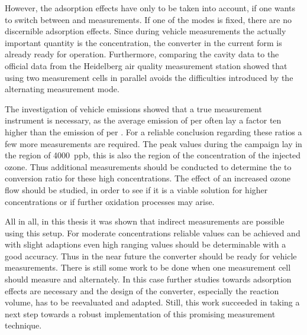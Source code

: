 However, the adsorption effects have only to be taken into account, if
one wants to switch between  and  measurements. If
one of the modes is fixed, there are no discernible
adsorption effects. Since during vehicle measurements the actually
important quantity is the  concentration, the converter in
the current form is already ready for operation. Furthermore,
comparing the cavity data to the official data from the Heidelberg air
quality measurement station showed that using two measurement cells in
parallel avoids the difficulties introduced by the alternating
measurement mode.

The investigation of vehicle emissions showed that a true 
measurement instrument is necessary, as the average emission of
 per  often lay a factor ten higher than the emission
of  per . For a reliable conclusion regarding these
ratios a few more measurements are required. The peak  values
during the campaign lay in the region of \SI{4000}{ppb}, this is also
the region of the concentration of the injected ozone. Thus additional
measurements should be conducted to determine the  to 
conversion ratio for these high concentrations. The effect of an
increased ozone flow should be studied, in order to see if it is a
viable solution for higher concentrations or if further oxidation
processes may arise.

All in all, in this thesis it was shown that indirect 
measurements are possible using this setup. For moderate
concentrations reliable  values can be achieved and with
slight adaptions even high ranging  values should be
determinable with a good accuracy. Thus in the near future the
converter should be ready for  vehicle measurements. There is
still some work to be done when one measurement cell should measure
 and  alternately. In this case further studies
towards adsorption effects are necessary and the design of the
converter, especially the reaction volume, has to be reevaluated and
adapted. Still, this work succeeded in taking a next step towards a
robust implementation of this promising measurement technique.

